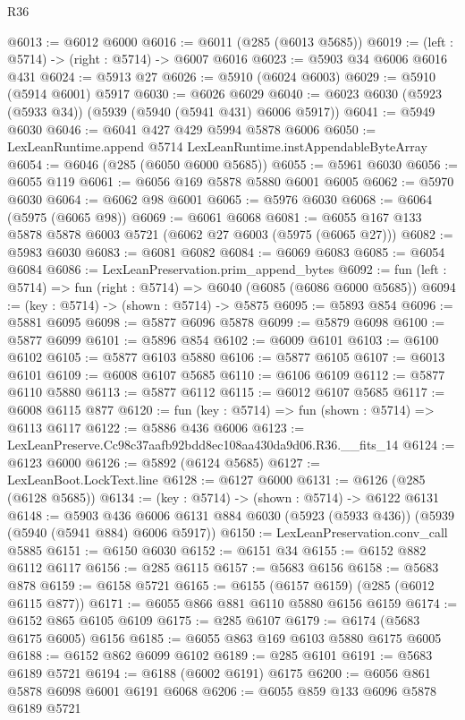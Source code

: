 \begin{lexlean}{R36}
\begin{coremodule}
@6013 := @6012 @6000
@6016 := @6011 (@285 (@6013 @5685))
@6019 := (left : @5714) -> (right : @5714) -> @6007 @6016
@6023 := @5903 @34 @6006 @6016 @431
@6024 := @5913 @27
@6026 := @5910 (@6024 @6003)
@6029 := @5910 (@5914 @6001) @5917
@6030 := @6026 @6029
@6040 := @6023 @6030 (@5923 (@5933 @34)) (@5939 (@5940 (@5941 @431) @6006 @5917))
@6041 := @5949 @6030
@6046 := @6041 @427 @429 @5994 @5878 @6006
@6050 := LexLeanRuntime.append @5714 LexLeanRuntime.instAppendableByteArray
@6054 := @6046 (@285 (@6050 @6000 @5685))
@6055 := @5961 @6030
@6056 := @6055 @119
@6061 := @6056 @169 @5878 @5880 @6001 @6005
@6062 := @5970 @6030
@6064 := @6062 @98 @6001
@6065 := @5976 @6030
@6068 := @6064 (@5975 (@6065 @98))
@6069 := @6061 @6068
@6081 := @6055 @167 @133 @5878 @5878 @6003 @5721 (@6062 @27 @6003 (@5975 (@6065 @27)))
@6082 := @5983 @6030
@6083 := @6081 @6082
@6084 := @6069 @6083
@6085 := @6054 @6084
@6086 := LexLeanPreservation.prim_append_bytes
@6092 := fun (left : @5714) => fun (right : @5714) => @6040 (@6085 (@6086 @6000 @5685))
@6094 := (key : @5714) -> (shown : @5714) -> @5875
@6095 := @5893 @854
@6096 := @5881 @6095
@6098 := @5877 @6096 @5878
@6099 := @5879 @6098
@6100 := @5877 @6099
@6101 := @5896 @854
@6102 := @6009 @6101
@6103 := @6100 @6102
@6105 := @5877 @6103 @5880
@6106 := @5877 @6105
@6107 := @6013 @6101
@6109 := @6008 @6107 @5685
@6110 := @6106 @6109
@6112 := @5877 @6110 @5880
@6113 := @5877 @6112
@6115 := @6012 @6107 @5685
@6117 := @6008 @6115 @877
@6120 := fun (key : @5714) => fun (shown : @5714) => @6113 @6117
@6122 := @5886 @436 @6006
@6123 := LexLeanPreserve.Cc98c37aafb92bdd8ec108aa430da9d06.R36.__fits_14
@6124 := @6123 @6000
@6126 := @5892 (@6124 @5685)
@6127 := LexLeanBoot.LockText.line
@6128 := @6127 @6000
@6131 := @6126 (@285 (@6128 @5685))
@6134 := (key : @5714) -> (shown : @5714) -> @6122 @6131
@6148 := @5903
    @436
    @6006
    @6131
    @884
    @6030
    (@5923 (@5933 @436))
    (@5939 (@5940 (@5941 @884) @6006 @5917))
@6150 := LexLeanPreservation.conv_call @5885
@6151 := @6150 @6030
@6152 := @6151 @34
@6155 := @6152 @882 @6112 @6117
@6156 := @285 @6115
@6157 := @5683 @6156
@6158 := @5683 @878
@6159 := @6158 @5721
@6165 := @6155 (@6157 @6159) (@285 (@6012 @6115 @877))
@6171 := @6055 @866 @881 @6110 @5880 @6156 @6159
@6174 := @6152 @865 @6105 @6109
@6175 := @285 @6107
@6179 := @6174 (@5683 @6175 @6005) @6156
@6185 := @6055 @863 @169 @6103 @5880 @6175 @6005
@6188 := @6152 @862 @6099 @6102
@6189 := @285 @6101
@6191 := @5683 @6189 @5721
@6194 := @6188 (@6002 @6191) @6175
@6200 := @6056 @861 @5878 @6098 @6001 @6191 @6068
@6206 := @6055 @859 @133 @6096 @5878 @6189 @5721

\end{coremodule}
\end{lexlean}
